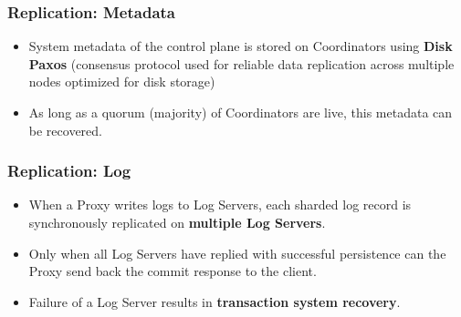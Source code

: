 






\begin{frame}
	\frametitle{Replication: Metadata}
    \begin{itemize}
      \item System metadata of the control plane is stored on Coordinators using \textbf{Disk Paxos} (consensus protocol used for reliable data replication across multiple nodes optimized for disk storage)
      \item As long as a quorum (majority) of Coordinators are live, this metadata can be recovered.

\end{itemize}
\end{frame}



\begin{frame}
	\frametitle{Replication: Log}
\begin{itemize}

      \item When a Proxy writes logs to Log Servers, each sharded log record is synchronously replicated on \textbf{multiple Log Servers}.
      \item Only when all Log Servers have replied with successful persistence can the Proxy send back the commit response to the client.
      \item Failure of a Log Server results in \textbf{transaction system recovery}.

\end{itemize}
\end{frame}

